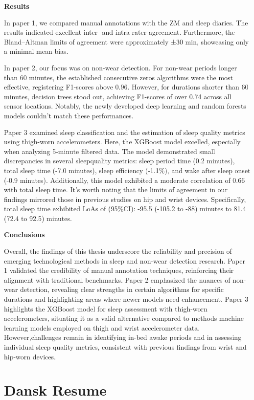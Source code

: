 \documentclass[
  9pt,
]{scrbook}
\begin{document}
\textbf{Results}

In paper 1, we compared manual annotations with the ZM and sleep
diaries. The results indicated excellent inter- and intra-rater
agreement. Furthermore, the Bland--Altman limits of agreement were
approximately ±30 min, showcasing only a minimal mean bias.

In paper 2, our focus was on non-wear detection. For non-wear periods
longer than 60 minutes, the established consecutive zeros algorithms
were the most effective, registering F1-scores above 0.96. However, for
durations shorter than 60 minutes, decision trees stood out, achieving
F1-scores of over 0.74 across all sensor locations. Notably, the newly
developed deep learning and random forests models couldn't match these
performances.

Paper 3 examined sleep classification and the estimation of sleep
quality metrics using thigh-worn accelerometers. Here, the XGBoost model
excelled, especially when analyzing 5-minute filtered data. The model
demonstrated small discrepancies in several sleepquality metrics: sleep
period time (0.2 minutes), total sleep time (-7.0 minutes), sleep
efficiency (-1.1\%), and wake after sleep onset (-0.9 minutes).
Additionally, this model exhibited a moderate correlation of 0.66 with
total sleep time. It's worth noting that the limits of agreement in our
findings mirrored those in previous studies on hip and wrist devices.
Specifically, total sleep time exhibited LoAs of (95\%CI): -95.5 (-105.2
to -88) minutes to 81.4 (72.4 to 92.5) minutes.

\textbf{Conclusions}

Overall, the findings of this thesis underscore the reliability and
precision of emerging technological methods in sleep and non-wear
detection research. Paper 1 validated the credibility of manual
annotation techniques, reinforcing their alignment with traditional
benchmarks. Paper 2 emphasized the nuances of non-wear detection,
revealing clear strengths in certain algorithms for specific durations
and highlighting areas where newer models need enhancement. Paper 3
highlights the XGBoost model for sleep assessment with thigh-worn
accelerometers, situating it as a valid alternative compared to methods
machine learning models employed on thigh and wrist accelerometer data.
However,challenges remain in identifying in-bed awake periods and in
assessing individual sleep quality metrics, consistent with previous
findings from wrist and hip-worn devices.

\hypertarget{dansk-resume}{%
\chapter{Dansk Resume}\label{dansk-resume}}
\end{document}
